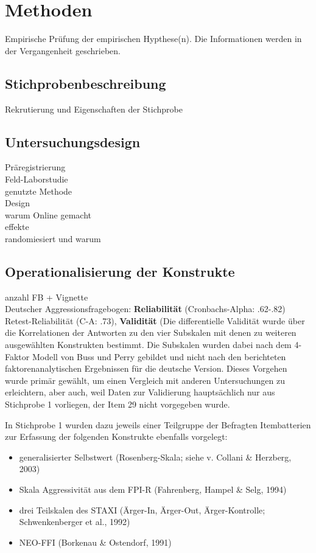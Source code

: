 \chapter{Methoden}   \label{ch_3}
Empirische Prüfung der empirischen Hypthese(n). Die Informationen werden in der Vergangenheit geschrieben.

\section{Stichprobenbeschreibung} \label{sec_3.1}
Rekrutierung und Eigenschaften der Stichprobe


\section{Untersuchungsdesign}  \label{sec_3.2}
Präregistrierung \\ %
Feld-Laborstudie\\
genutzte Methode \\
Design \\
warum Online gemacht \\
effekte\\
randomiesiert und warum


\section{Operationalisierung der Konstrukte}    \label{sec_3.3}
anzahl FB + Vignette\\ %
Deutscher Aggressionsfragebogen: \textbf{Reliabilität} (Cronbachs-Alpha: .62-.82) Retest-Reliabilität (C-A: .73), \textbf{Validität} (Die differentielle Validität wurde über die Korrelationen der Antworten zu den vier Subskalen mit denen zu weiteren ausgewählten Konstrukten bestimmt. Die Subskalen wurden dabei nach dem 4-Faktor Modell von Buss und Perry gebildet und nicht nach den berichteten faktorenanalytischen Ergebnissen für die deutsche Version. Dieses Vorgehen wurde primär gewählt, um einen Vergleich mit anderen Untersuchungen zu erleichtern, aber auch, weil Daten zur Validierung hauptsächlich nur aus Stichprobe 1 vorliegen, der Item 29 nicht vorgegeben wurde.

In Stichprobe 1 wurden dazu jeweils einer Teilgruppe der Befragten Itembatterien zur Erfassung der folgenden Konstrukte ebenfalls vorgelegt:
\begin{itemize}
    \item generalisierter Selbstwert (Rosenberg-Skala; siehe v. Collani \& Herzberg, 2003)
    \item Skala Aggressivität aus dem FPI-R (Fahrenberg, Hampel \& Selg, 1994)
    \item drei Teilskalen des STAXI (Ärger-In, Ärger-Out, Ärger-Kontrolle; Schwenkenberger et al., 1992)
    \item NEO-FFI (Borkenau \& Ostendorf, 1991)
\end{itemize}

